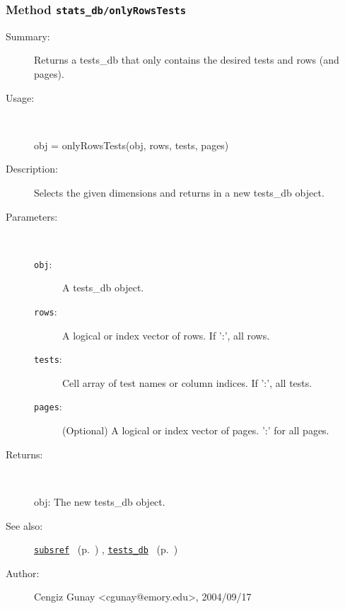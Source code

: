 \subsubsection[Method \texttt{onlyRowsTests}]{Method \texttt{stats\_db/onlyRowsTests}}%
%
\label{ref_stats_db__onlyRowsTests}%
\hypertarget{ref_stats_db__onlyRowsTests}{}%
\begin{description}
\item[Summary:]Returns a tests\_db that only contains the desired 
		tests and rows (and pages).
%
\item[Usage:]~%
\begin{lyxcode}%
obj = onlyRowsTests(obj, rows, tests, pages)
%
\end{lyxcode}%
%
\item[Description:]%
Selects the given dimensions and returns in a new tests\_db object.
\item[Parameters:]~
\begin{description}%
\item[\texttt{obj}:]
 A tests\_db object.
\item[\texttt{rows}:]
 A logical or index vector of rows. If ':', all rows.
\item[\texttt{tests}:]
 Cell array of test names or column indices. If ':', all tests.
\item[\texttt{pages}:]
 (Optional) A logical or index vector of pages. ':' for all pages.
\end{description}%
%
\item[Returns:
]~

	obj: The new tests\_db object.
%
%
\item[See also:]%
\hyperlink{ref_subsref}{\texttt{subsref}}%
\ (p.~\pageref{ref_subsref})%
%
, \hyperlink{ref_tests_db}{\texttt{tests\_db}}%
\ (p.~\pageref{ref_tests_db})%
%
%
\item[Author:]%
Cengiz Gunay <cgunay@emory.edu>, 2004/09/17
%
\end{description}
\methodline%
